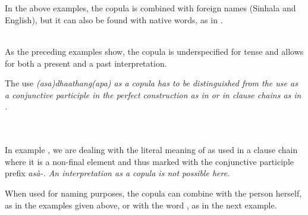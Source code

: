  \\
 \\
In the above examples, the copula is combined with foreign names (Sinhala and English), but it can also be found with native words, as in .


 \\
As the preceding examples show, the copula is underspecified for tense and allows for both a present and a past interpretation.

The use \em (asa)dhaathang(apa) \em as a copula has to be distinguished from the use as a conjunctive participle in the perfect construction as in   or in clause chains as in .


 \\
 \\
In example , we are dealing with the literal meaning of  as used in a clause chain where it is a non-final element and thus marked with the conjunctive participle prefix \em asà-\em. An interpretation as a copula is not possible here.

When used for naming purposes, the copula can combine with the person herself, as in the examples given above, or with the word , as in the next example.


